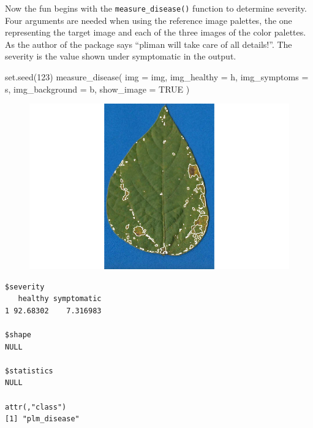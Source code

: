 \documentclass[
  letterpaper,
  DIV=11,
  numbers=noendperiod]{scrreprt}
\newenvironment{Shaded}{\begin{snugshade}}{\end{snugshade}}
\newcommand{\AttributeTok}[1]{\textcolor[rgb]{0.40,0.45,0.13}{#1}}
\newcommand{\ConstantTok}[1]{\textcolor[rgb]{0.56,0.35,0.01}{#1}}
\newcommand{\DecValTok}[1]{\textcolor[rgb]{0.68,0.00,0.00}{#1}}
\newcommand{\FunctionTok}[1]{\textcolor[rgb]{0.28,0.35,0.67}{#1}}
\newcommand{\NormalTok}[1]{\textcolor[rgb]{0.00,0.23,0.31}{#1}}
\begin{document}
Now the fun begins with the \texttt{measure\_disease()} function to
determine severity. Four arguments are needed when using the reference
image palettes, the one representing the target image and each of the
three images of the color palettes. As the author of the package says
``pliman will take care of all details!''. The severity is the value
shown under symptomatic in the output.

\begin{Shaded}
\begin{Highlighting}[]
\FunctionTok{set.seed}\NormalTok{(}\DecValTok{123}\NormalTok{)}
\FunctionTok{measure\_disease}\NormalTok{(}
  \AttributeTok{img =}\NormalTok{ img,}
  \AttributeTok{img\_healthy =}\NormalTok{ h,}
  \AttributeTok{img\_symptoms =}\NormalTok{ s,}
  \AttributeTok{img\_background =}\NormalTok{ b,}
  \AttributeTok{show\_image =} \ConstantTok{TRUE}
\NormalTok{)}
\end{Highlighting}
\end{Shaded}

\begin{figure}[H]

{\centering \includegraphics{./data-actual-severity_files/figure-pdf/unnamed-chunk-6-1.pdf}

}

\end{figure}

\begin{verbatim}
$severity
   healthy symptomatic
1 92.68302    7.316983

$shape
NULL

$statistics
NULL

attr(,"class")
[1] "plm_disease"
\end{verbatim}
\end{document}
